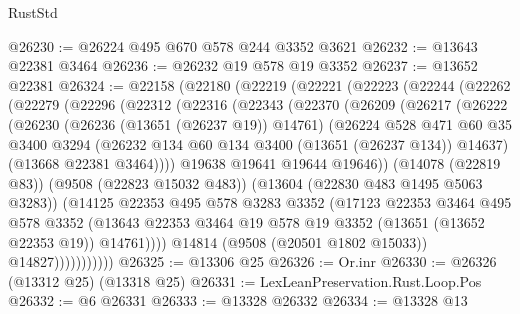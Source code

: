 \begin{lexlean}{RustStd}
\begin{coremodule}
@26230 := @26224 @495 @670 @578 @244 @3352 @3621
@26232 := @13643 @22381 @3464
@26236 := @26232 @19 @578 @19 @3352
@26237 := @13652 @22381
@26324 := @22158
    (@22180
      (@22219
        (@22221
          (@22223
            (@22244
              (@22262
                (@22279
                  (@22296
                    (@22312
                      (@22316
                        (@22343
                          (@22370
                            (@26209
                              (@26217
                                (@26222
                                  (@26230
                                    (@26236 (@13651 (@26237 @19)) @14761)
                                    (@26224
                                      @528
                                      @471
                                      @60
                                      @35
                                      @3400
                                      @3294
                                      (@26232 @134 @60 @134 @3400 (@13651 (@26237 @134)) @14637)
                                      (@13668 @22381 @3464))))
                                @19638
                                @19641
                                @19644
                                @19646))
                            (@14078 (@22819 @83))
                            (@9508 (@22823 @15032 @483))
                            (@13604 (@22830 @483 @1495 @5063 @3283))
                            (@14125
                              @22353
                              @495
                              @578
                              @3283
                              @3352
                              (@17123
                                @22353
                                @3464
                                @495
                                @578
                                @3352
                                (@13643
                                  @22353
                                  @3464
                                  @19
                                  @578
                                  @19
                                  @3352
                                  (@13651 (@13652 @22353 @19))
                                  @14761))))
                          @14814
                          (@9508 (@20501 @1802 @15033))
                          @14827)))))))))))
@26325 := @13306 @25
@26326 := Or.inr
@26330 := @26326 (@13312 @25) (@13318 @25)
@26331 := LexLeanPreservation.Rust.Loop.Pos
@26332 := @6 @26331
@26333 := @13328 @26332
@26334 := @13328 @13

\end{coremodule}
\end{lexlean}
